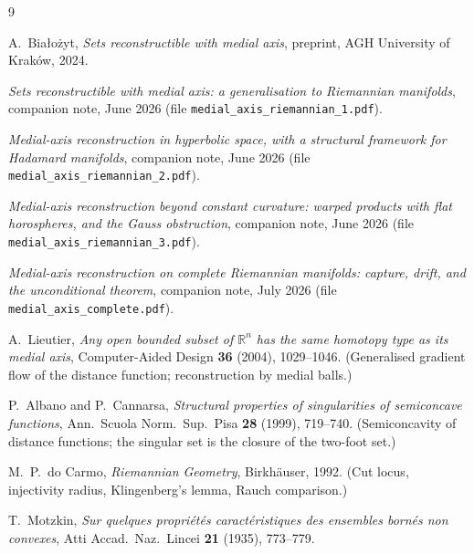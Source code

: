 \documentclass[11pt]{article}
\theoremstyle{remark}
\newcommand{\R}{\mathbb{R}}
\begin{document}
\begin{thebibliography}{9}

 A.~Bia\l{}o\.zyt, \emph{Sets reconstructible with medial
axis}, preprint, AGH University of Krak\'ow, 2024.

 \emph{Sets reconstructible with medial axis: a
generalisation to Riemannian manifolds}, companion note, June 2026
(file \texttt{medial\_axis\_riemannian\_1.pdf}).

 \emph{Medial-axis reconstruction in hyperbolic space, with a
structural framework for Hadamard manifolds}, companion note, June 2026
(file \texttt{medial\_axis\_riemannian\_2.pdf}).

 \emph{Medial-axis reconstruction beyond constant curvature:
warped products with flat horospheres, and the Gauss obstruction},
companion note, June 2026 (file
\texttt{medial\_axis\_riemannian\_3.pdf}).

 \emph{Medial-axis reconstruction on complete Riemannian
manifolds: capture, drift, and the unconditional theorem}, companion
note, July 2026 (file \texttt{medial\_axis\_complete.pdf}).

 A.~Lieutier, \emph{Any open bounded subset of $\R^{n}$ has
the same homotopy type as its medial axis}, Computer-Aided Design
\textbf{36} (2004), 1029--1046. (Generalised gradient flow of the distance
function; reconstruction by medial balls.)

 P.~Albano and P.~Cannarsa, \emph{Structural properties of
singularities of semiconcave functions}, Ann.\ Scuola Norm.\ Sup.\ Pisa
\textbf{28} (1999), 719--740. (Semiconcavity of distance functions; the
singular set is the closure of the two-foot set.)

 M.~P.~do Carmo, \emph{Riemannian Geometry},
Birkh\"auser, 1992. (Cut locus, injectivity radius, Klingenberg's lemma,
Rauch comparison.)

 T.~Motzkin, \emph{Sur quelques propri\'et\'es
caract\'eristiques des ensembles born\'es non convexes}, Atti Accad.\
Naz.\ Lincei \textbf{21} (1935), 773--779.

\end{thebibliography}
\end{document}
